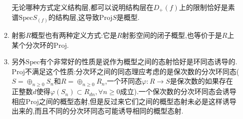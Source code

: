 \begin{enumerate}
\begin{enumerate}
		无论哪种方式定义结构层,都可以说明结构层在$D_+(f)$上的限制恰好是素谱$\mathrm{Spec}S_{(f)}$的结构层,这导致$\mathrm{Proj}S$是概型.
		\item 射影$R$概型也有两种定义方式:它是$R$射影空间的闭子概型,也等价于是$R$上某个分次环的$\mathrm{Proj}$.
		\item 另外$\mathrm{Spec}$有个非常好的性质是说作为概型之间的态射恰好是环同态诱导的.$\mathrm{Proj}$不满足这个性质:分次环之间的同态理应考虑的是保次数的分次环同态($S=\oplus_{n\ge0}S_n$和$R=\oplus_{n\ge0}R_n$,一个环同态$\varphi:R\to S$是保次数的如果存在正整数$d$使得$\varphi(S_n)\subset R_{dn},\forall n\ge0$成立).一个保次数的分次环同态会诱导相应$\mathrm{Proj}$之间的概型态射,但是反过来它们之间的概型态射未必是这样诱导出来的,而且不同的分次环同态可能诱导相同的概型态射.
	\end{enumerate}
	
	
	
\end{enumerate}







